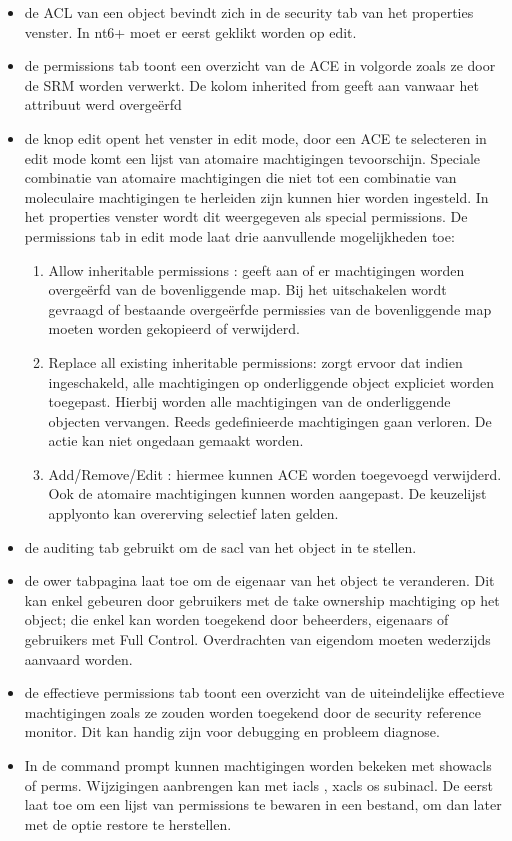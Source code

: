 \begin{itemize}
\item de ACL van een object bevindt zich in de security tab van het properties venster. In nt6+ moet er eerst geklikt worden op edit.
\item de permissions tab toont een overzicht van de ACE in volgorde zoals ze door de SRM worden verwerkt. De kolom inherited from geeft aan vanwaar het attribuut werd overge\"erfd 
\clearpage
\item de knop edit opent het venster in edit mode, door een ACE te selecteren in edit mode komt een lijst van atomaire machtigingen tevoorschijn. Speciale combinatie van atomaire machtigingen die niet tot een combinatie van moleculaire machtigingen te herleiden zijn kunnen hier worden ingesteld. In het properties venster wordt dit weergegeven als special permissions. De permissions tab in edit mode laat drie aanvullende mogelijkheden toe:
\begin{enumerate}
\item Allow inheritable permissions : geeft aan of er machtigingen worden overge\"erfd van de bovenliggende map. Bij het uitschakelen wordt gevraagd of bestaande overge\"erfde permissies van de bovenliggende map moeten worden gekopieerd of verwijderd.
\item Replace all existing inheritable permissions: zorgt ervoor dat indien ingeschakeld, alle machtigingen op onderliggende object expliciet worden toegepast. Hierbij worden alle machtigingen van de onderliggende objecten vervangen. Reeds gedefinieerde machtigingen gaan verloren. De actie kan niet ongedaan gemaakt worden.
\item Add/Remove/Edit : hiermee kunnen ACE worden toegevoegd verwijderd. Ook de atomaire machtigingen kunnen worden aangepast. De keuzelijst applyonto kan overerving selectief laten gelden.
\end{enumerate}
\item de auditing tab gebruikt om de sacl van het object in te stellen.
\item de ower tabpagina laat toe om de eigenaar van het object te veranderen. Dit kan enkel gebeuren door gebruikers met de take ownership machtiging op het object; die enkel kan worden toegekend door beheerders, eigenaars of gebruikers met Full Control. Overdrachten van eigendom moeten wederzijds aanvaard worden.
\item de effectieve permissions tab toont een overzicht van de uiteindelijke effectieve machtigingen zoals ze zouden worden toegekend door de security reference monitor. Dit kan handig zijn voor debugging en probleem diagnose.

\item In de command prompt kunnen machtigingen worden bekeken met showacls of perms. Wijzigingen aanbrengen kan met iacls , xacls os subinacl. De eerst laat toe om een lijst van permissions te bewaren in een bestand, om dan later met de optie restore te herstellen.
\end{itemize}

